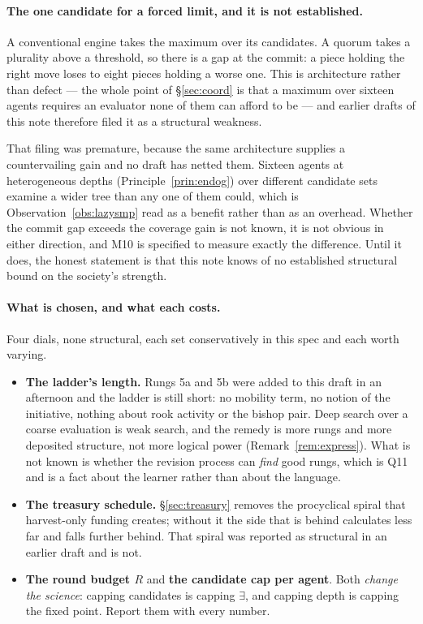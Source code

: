 \documentclass[11pt,a4paper]{article}
\theoremstyle{plain}
\theoremstyle{definition}
\theoremstyle{remark}
\begin{document}
\paragraph{The one candidate for a forced limit, and it is not established.} A
conventional engine takes the maximum over its candidates. A quorum takes a
plurality above a threshold, so there is a gap at the commit: a piece holding the
right move loses to eight pieces holding a worse one. This is architecture rather
than defect --- the whole point of \S\ref{sec:coord} is that a maximum over
sixteen agents requires an evaluator none of them can afford to be --- and
earlier drafts of this note therefore filed it as a structural weakness.

That filing was premature, because the same architecture supplies a countervailing
gain and no draft has netted them. Sixteen agents at heterogeneous depths
(Principle~\ref{prin:endog}) over different candidate sets examine a wider tree
than any one of them could, which is Observation~\ref{obs:lazysmp} read as a
benefit rather than as an overhead. Whether the commit gap exceeds the coverage
gain is not known, it is not obvious in either direction, and M10 is specified to
measure exactly the difference. Until it does, the honest statement is that this
note knows of no established structural bound on the society's strength.

\paragraph{What is chosen, and what each costs.} Four dials, none structural,
each set conservatively in this spec and each worth varying.
\begin{itemize}[leftmargin=1.6em]
\item \textbf{The ladder's length.} Rungs 5a and 5b were added to this draft in
an afternoon and the ladder is still short: no mobility term, no notion of the
initiative, nothing about rook activity or the bishop pair. Deep search over a
coarse evaluation is weak search, and the remedy is more rungs and more
deposited structure, not more logical power (Remark~\ref{rem:express}). What is
not known is whether the revision process can \emph{find} good rungs, which is
Q11 and is a fact about the learner rather than about the language.
\item \textbf{The treasury schedule.} \S\ref{sec:treasury} removes the
procyclical spiral that harvest-only funding creates; without it the side that is
behind calculates less far and falls further behind. That spiral was reported as
structural in an earlier draft and is not.
\item \textbf{The round budget $R$} and \textbf{the candidate cap per agent}.
Both \emph{change the science}: capping candidates is capping $\exists$, and
capping depth is capping the fixed point. Report them with every number.
\end{itemize}
\end{document}
